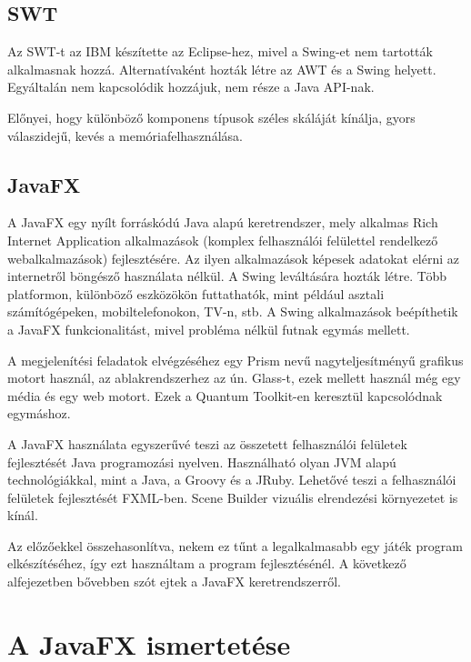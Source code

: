 \subsection*{SWT}

Az SWT-t az IBM készítette az Eclipse-hez, mivel a Swing-et nem tartották alkalmasnak hozzá. Alternatívaként hozták létre az AWT és a Swing helyett. Egyáltalán nem kapcsolódik hozzájuk, nem része a Java API-nak. 

Előnyei, hogy különböző komponens típusok széles skáláját kínálja, gyors válaszidejű, kevés a memóriafelhasználása. 

\subsection*{JavaFX}

A JavaFX egy nyílt forráskódú Java alapú keretrendszer, mely alkalmas Rich Internet Application alkalmazások (komplex felhasználói felülettel rendelkező webalkalmazások) fejlesztésére. Az ilyen alkalmazások képesek adatokat elérni az internetről böngésző használata nélkül. A Swing leváltására hozták létre. Több platformon, különböző eszközökön futtathatók, mint például asztali számítógépeken, mobiltelefonokon, TV-n, stb. A Swing alkalmazások beépíthetik a JavaFX funkcionalitást, mivel probléma nélkül futnak egymás mellett. 

A megjelenítési feladatok elvégzéséhez egy Prism nevű nagyteljesítményű grafikus motort használ, az ablakrendszerhez az ún. Glass-t, ezek mellett használ még egy média és egy web motort. Ezek a Quantum Toolkit-en keresztül kapcsolódnak egymáshoz. 

A JavaFX használata egyszerűvé teszi az összetett felhasználói felületek fejlesztését Java programozási nyelven. Használható olyan JVM alapú technológiákkal, mint a Java, a Groovy és a JRuby. Lehetővé teszi a felhasználói felületek fejlesztését FXML-ben. Scene Builder vizuális elrendezési környezetet is kínál. 

Az előzőekkel összehasonlítva, nekem ez tűnt a legalkalmasabb egy játék program elkészítéséhez, így ezt használtam a program fejlesztésénél. A következő alfejezetben bővebben szót ejtek a JavaFX keretrendszerről. 

\section{A JavaFX ismertetése}


